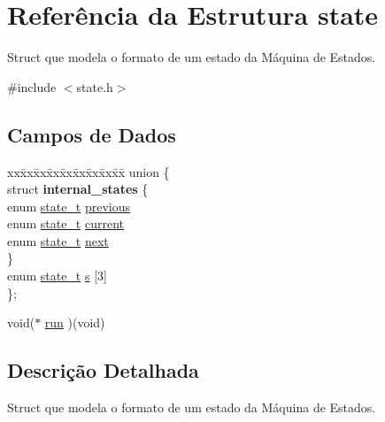 \hypertarget{structstate}{}\section{Referência da Estrutura state}
\label{structstate}


Struct que modela o formato de um estado da Máquina de Estados.  




{\ttfamily \#include $<$state.\+h$>$}

\subsection*{Campos de Dados}
\begin{DoxyCompactItemize}
\item 
\begin{tabbing}
xx\=xx\=xx\=xx\=xx\=xx\=xx\=xx\=xx\=\kill
union \{\\
\>struct {\bfseries internal\_states} \{\\
\>\>enum \hyperlink{state_8h_aa0aafed44fec19806d8f9ad834be1248}{state\_t} \hyperlink{structstate_a276d20af15eb7cc14800557d670eb8a5}{previous}\\
\>\>enum \hyperlink{state_8h_aa0aafed44fec19806d8f9ad834be1248}{state\_t} \hyperlink{structstate_aa23ac3f3183e79172bab91684e0195e1}{current}\\
\>\>enum \hyperlink{state_8h_aa0aafed44fec19806d8f9ad834be1248}{state\_t} \hyperlink{structstate_a24e4d9ff5dc7891e048ee578ba970837}{next}\\
\>\} \hypertarget{unionstate_1_1_0D0_a3c849dbd83637b100181b78ad752620c}{}\label{unionstate_1_1_0D0_a3c849dbd83637b100181b78ad752620c}
\\
\>enum \hyperlink{state_8h_aa0aafed44fec19806d8f9ad834be1248}{state\_t} \hyperlink{structstate_a8a9de0cd847e8ae900e15eb66fe408f2}{s} \mbox{[}3\mbox{]}\\
\}; \hypertarget{structstate_a836fa023107dfb286044c007f23358b7}{}\label{structstate_a836fa023107dfb286044c007f23358b7}
\\

\end{tabbing}\item 
void($\ast$ \hyperlink{structstate_a90aac7b165377e812886e60e28d054bf}{run} )(void)
\end{DoxyCompactItemize}


\subsection{Descrição Detalhada}
Struct que modela o formato de um estado da Máquina de Estados. 


